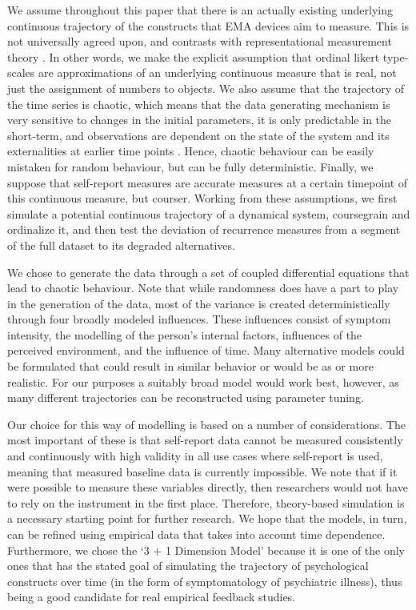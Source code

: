 \documentclass[utf8]{FrontiersinVancouver}
\begin{document}
We assume throughout this paper that there is an actually existing underlying continuous trajectory of the constructs that EMA devices aim to measure. This is not universally agreed upon, and contrasts with representational measurement theory \citep{michellRepresentationalMeasurementTheory2021}. In other words, we make the explicit assumption that ordinal likert type-scales are approximations of an underlying continuous measure that is real, not just the assignment of numbers to objects. We also assume that the trajectory of the time series is chaotic, which means that the data generating mechanism is very sensitive to changes in the initial parameters, it is only predictable in the short-term, and observations are dependent on the state of the system and its externalities at earlier time points \citep{olthofComplexityPsychologicalSelfratings2020b}.  Hence, chaotic behaviour can be easily mistaken for random behaviour, but can be fully deterministic. Finally, we suppose that self-report measures are accurate measures at a certain timepoint of this continuous measure, but courser. Working from these assumptions, we first simulate a potential continuous trajectory of a dynamical system, coursegrain and ordinalize it, and then test the deviation of recurrence measures from a segment of the full dataset to its degraded alternatives. 

We chose to generate the data through a set of coupled differential equations that lead to chaotic behaviour. Note that while randomness does have a part to play in the generation of the data, most of the variance is created deterministically through four broadly modeled influences. These influences consist of symptom intensity, the modelling of the person's internal factors, influences of the perceived environment, and the influence of time. Many alternative models could be formulated that could result in similar behavior or would be as or more realistic. For our purposes a suitably broad model would work best, however, as many different trajectories can be reconstructed using parameter tuning. 

Our choice for this way of modelling is based on a number of considerations. The most important of these is that self-report data cannot be measured consistently and continuously with high validity in all use cases where self-report is used, meaning that measured baseline data is currently impossible. We note that if it were possible to measure these variables directly, then researchers would not have to rely on the instrument in the first place. Therefore, theory-based simulation is a necessary starting point for further research. We hope that the models, in turn, can be refined using empirical data that takes into account time dependence. Furthermore, we chose the `3 + 1 Dimension Model' because it is one of the only ones that has the stated goal of simulating the trajectory of psychological constructs over time (in the form of symptomatology of psychiatric illness), thus being a good candidate for real empirical feedback studies. 
\end{document}
